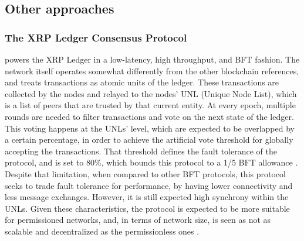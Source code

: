 \documentclass[journal]{IEEEtran}
\begin{document}
\subsection{Other approaches}

\subsubsection{The XRP Ledger Consensus Protocol} powers the XRP Ledger in a
low-latency, high throughput, and  BFT fashion. The network itself operates somewhat
differently from the other blockchain references, and treats transactions as atomic units of 
the ledger. These transactions are collected by the nodes and relayed to the
nodes' UNL (Unique Node List), which is a list of peers that are trusted by that current
entity. At every epoch, multiple rounds are needed to filter transactions and vote 
on the next state of the ledger. This voting happens at the 
UNLs' level, which are expected to be overlapped by a certain percentage,
in order to achieve the artificial vote threshold for globally accepting the transactions.
That threshold defines the fault tolerance of the protocol, and is set to 80\%, which 
bounds this protocol to a 1/5 BFT allowance \cite{schwartz2014ripple, chase2018analysis}. 
Despite that limitation, when compared to other BFT protocols, this protocol seeks to trade 
fault tolerance for performance, by having lower connectivity and less message exchanges. 
However, it is still expected high synchrony within the UNLs. Given these characteristics, the protocol
is expected to be more suitable for permissioned networks, and, in terms of network size,
is seen as not as scalable and decentralized as the permissionless ones \cite{survey-dist-consensus}.
\end{document}
